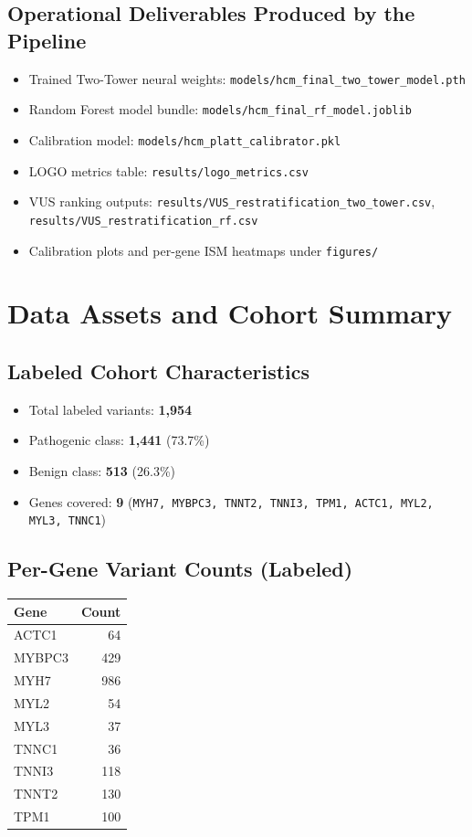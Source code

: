 \documentclass[11pt,a4paper]{article}
\begin{document}
\subsection{Operational Deliverables Produced by the Pipeline}
\begin{itemize}[leftmargin=1.2cm]
    \item Trained Two-Tower neural weights: \texttt{models/hcm\_final\_two\_tower\_model.pth}
    \item Random Forest model bundle: \texttt{models/hcm\_final\_rf\_model.joblib}
    \item Calibration model: \texttt{models/hcm\_platt\_calibrator.pkl}
    \item LOGO metrics table: \texttt{results/logo\_metrics.csv}
    \item VUS ranking outputs: \texttt{results/VUS\_restratification\_two\_tower.csv}, \texttt{results/VUS\_restratification\_rf.csv}
    \item Calibration plots and per-gene ISM heatmaps under \texttt{figures/}
\end{itemize}

\section{Data Assets and Cohort Summary}
\subsection{Labeled Cohort Characteristics}
\begin{itemize}[leftmargin=1.2cm]
    \item Total labeled variants: \textbf{1,954}
    \item Pathogenic class: \textbf{1,441} (73.7\%)
    \item Benign class: \textbf{513} (26.3\%)
    \item Genes covered: \textbf{9} (\texttt{MYH7, MYBPC3, TNNT2, TNNI3, TPM1, ACTC1, MYL2, MYL3, TNNC1})
\end{itemize}

\subsection{Per-Gene Variant Counts (Labeled)}
\begin{center}
\begin{tabular}{lr}
\toprule
\textbf{Gene} & \textbf{Count} \\
\midrule
ACTC1 & 64 \\
MYBPC3 & 429 \\
MYH7 & 986 \\
MYL2 & 54 \\
MYL3 & 37 \\
TNNC1 & 36 \\
TNNI3 & 118 \\
TNNT2 & 130 \\
TPM1 & 100 \\
\bottomrule
\end{tabular}
\end{center}
\end{document}
